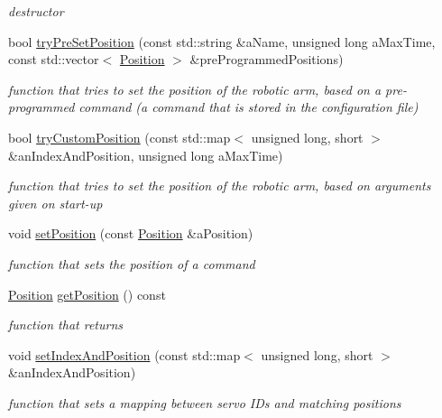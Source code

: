 \begin{DoxyCompactItemize}
\begin{DoxyCompactList}\small\item\em destructor \end{DoxyCompactList}\item 
bool \hyperlink{classRobotInterface_1_1HighLevel_1_1Command_a2a6e0ca99d15c43627744a219b433a69}{try\+Pre\+Set\+Position} (const std\+::string \&a\+Name, unsigned long a\+Max\+Time, const std\+::vector$<$ \hyperlink{structRobotInterface_1_1HighLevel_1_1Position}{Position} $>$ \&pre\+Programmed\+Positions)
\begin{DoxyCompactList}\small\item\em function that tries to set the position of the robotic arm, based on a pre-\/programmed command (a command that is stored in the configuration file) \end{DoxyCompactList}\item 
bool \hyperlink{classRobotInterface_1_1HighLevel_1_1Command_a83f8ceeea1d0ba165574b9a70ca43594}{try\+Custom\+Position} (const std\+::map$<$ unsigned long, short $>$ \&an\+Index\+And\+Position, unsigned long a\+Max\+Time)
\begin{DoxyCompactList}\small\item\em function that tries to set the position of the robotic arm, based on arguments given on start-\/up \end{DoxyCompactList}\item 
void \hyperlink{classRobotInterface_1_1HighLevel_1_1Command_a068858e0228462ad2e793027c11aa0f5}{set\+Position} (const \hyperlink{structRobotInterface_1_1HighLevel_1_1Position}{Position} \&a\+Position)
\begin{DoxyCompactList}\small\item\em function that sets the position of a command \end{DoxyCompactList}\item 
\hyperlink{structRobotInterface_1_1HighLevel_1_1Position}{Position} \hyperlink{classRobotInterface_1_1HighLevel_1_1Command_aeca878edba659883c183686221b5ae63}{get\+Position} () const 
\begin{DoxyCompactList}\small\item\em function that returns \end{DoxyCompactList}\item 
void \hyperlink{classRobotInterface_1_1HighLevel_1_1Command_ae6cc6ca95900cefafb25285de378c0ae}{set\+Index\+And\+Position} (const std\+::map$<$ unsigned long, short $>$ \&an\+Index\+And\+Position)
\begin{DoxyCompactList}\small\item\em function that sets a mapping between servo ID\textquotesingle{}s and matching positions \end{DoxyCompactList}\item 

\end{DoxyCompactItemize}
